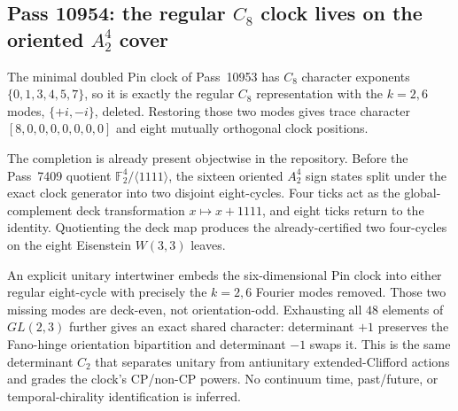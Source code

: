 \subsection{Pass 10954: the regular $C_8$ clock lives on the oriented $A_2^4$ cover}

The minimal doubled Pin clock of Pass~10953 has $C_8$ character exponents
$\{0,1,3,4,5,7\}$, so it is exactly the regular $C_8$ representation with
the $k=2,6$ modes, $\{+i,-i\}$, deleted.  Restoring those two modes gives
trace character $[8,0,0,0,0,0,0,0]$ and eight mutually orthogonal clock
positions.

The completion is already present objectwise in the repository.  Before the
Pass~7409 quotient $\mathbb F_2^4/\langle1111\rangle$, the sixteen oriented
$A_2^4$ sign states split under the exact clock generator into two disjoint
eight-cycles.  Four ticks act as the global-complement deck transformation
$x\mapsto x+1111$, and eight ticks return to the identity.  Quotienting the
deck map produces the already-certified two four-cycles on the eight
Eisenstein $W(3,3)$ leaves.

An explicit unitary intertwiner embeds the six-dimensional Pin clock into
either regular eight-cycle with precisely the $k=2,6$ Fourier modes removed.
Those two missing modes are deck-even, not orientation-odd.  Exhausting all
$48$ elements of $GL(2,3)$ further gives an exact shared character:
determinant $+1$ preserves the Fano-hinge orientation bipartition and
determinant $-1$ swaps it.  This is the same determinant $C_2$ that separates
unitary from antiunitary extended-Clifford actions and grades the clock's
CP/non-CP powers.  No continuum time, past/future, or temporal-chirality
identification is inferred.

